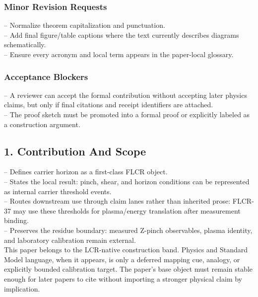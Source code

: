 \documentclass[11pt]{article}
\begin{document}
\subsubsection*{Minor Revision Requests}

\noindent{}-- Normalize theorem capitalization and punctuation.\\
\noindent{}-- Add final figure/table captions where the text currently describes diagrams schematically.\\
\noindent{}-- Ensure every acronym and local term appears in the paper-local glossary.\\

\subsubsection*{Acceptance Blockers}

\noindent{}-- A reviewer can accept the formal contribution without accepting later physics claims, but only if final citations and receipt identifiers are attached.\\
\noindent{}-- The proof sketch must be promoted into a formal proof or explicitly labeled as a construction argument.\\


\subsection*{1. Contribution And Scope}

\noindent{}-- Defines carrier horizon as a first-class FLCR object.\\
\noindent{}-- States the local result: pinch, shear, and horizon conditions can be represented as internal carrier threshold events.\\
\noindent{}-- Routes downstream use through claim lanes rather than inherited prose: FLCR-37 may use these thresholds for plasma/energy translation after measurement binding.\\
\noindent{}-- Preserves the residue boundary: measured Z-pinch observables, plasma identity, and laboratory calibration remain external.\\

This paper belongs to the LCR-native construction band. Physics and Standard Model language, when it appears, is only a deferred mapping cue, analogy, or explicitly bounded calibration target. The paper's base object must remain stable enough for later papers to cite without importing a stronger physical claim by implication.
\end{document}
